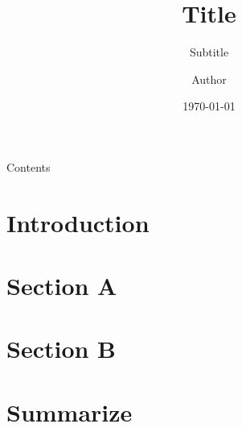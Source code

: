 \documentclass[compress,aspectratio=43]{beamer}
\title{Title}
\subtitle{Subtitle}
\author{Author}
\date{\today}
\institute[XXXX]{University of XXXX}
\begin{document}
\begin{frame}[plain]
    \titlepage
\end{frame}

\begin{frame}{Contents}
    \tableofcontents[sectionstyle=show,subsectionstyle=show/shaded/hide,
        subsubsectionstyle=show/shaded/hide]
\end{frame}

\section{Introduction}

\begin{frame}

\end{frame}

\section{Section A}

\begin{frame}

\end{frame}

\section{Section B}

\begin{frame}

\end{frame}

\section{Summarize}

\begin{frame}

\end{frame}
\end{document}

